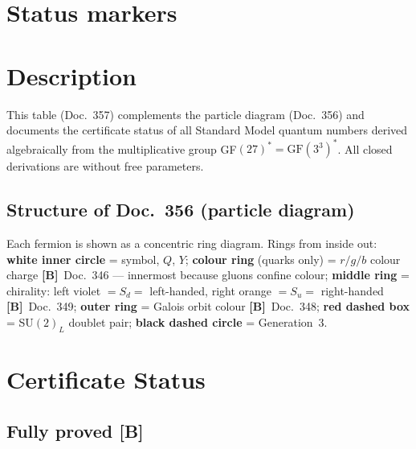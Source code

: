 \providecommand{\BM}{\textbf{[B]}}
\providecommand{\KM}{\textbf{[K]}}
\providecommand{\SM}{\textbf{[S]}}
\providecommand{\XM}{\textbf{[X]}}

{}

\section*{Status markers}


\section*{Description}

This table (Doc.~357) complements the particle diagram (Doc.~356) and
documents the certificate status of all Standard Model quantum numbers
derived algebraically from the multiplicative group GF$(27)^* =
\mathrm{GF}(3^3)^*$.
All closed derivations are without free parameters.

\subsection*{Structure of Doc.~356 (particle diagram)}

Each fermion is shown as a concentric ring diagram. Rings from inside out:
\textbf{white inner circle} = symbol, $Q$, $Y$;
\textbf{colour ring} (quarks only) = $r/g/b$ colour charge \BM\ Doc.~346
--- innermost because gluons confine colour;
\textbf{middle ring} = chirality: left violet $= S_d =$ left-handed,
right orange $= S_u =$ right-handed \BM\ Doc.~349;
\textbf{outer ring} = Galois orbit colour \BM\ Doc.~348;
\textbf{red dashed box} = SU$(2)_L$ doublet pair;
\textbf{black dashed circle} = Generation~3.

\section{Certificate Status}

\subsection*{Fully proved \BM}

